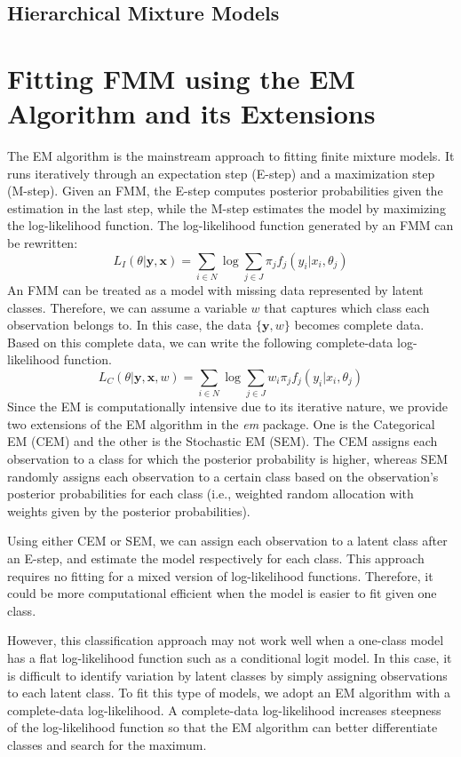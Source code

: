 \documentclass[nojss]{jss}
\begin{document}
      \subsection{Hierarchical Mixture Models}
   \section{Fitting FMM using the EM Algorithm and its Extensions}
   The EM algorithm is the mainstream approach to fitting finite mixture models. It runs iteratively through an expectation step (E-step) and a maximization step (M-step). Given an FMM, the E-step computes posterior probabilities given the estimation in the last step, while the M-step estimates the model by maximizing the log-likelihood function.
   The log-likelihood function generated by an FMM can be rewritten:
   \begin{equation}
   L_I(\theta|\mathbf{y},\mathbf{x}) = \sum_{i \in N} \log \sum_{j \in J} \pi_j f_j(y_i | x_i, \theta_j)
   \end{equation}
   An FMM can be treated as a model with missing data represented by latent classes. Therefore, we can assume a variable $w$ that captures which class each observation belongs to. In this case, the data $\{\mathbf{y}, w\}$ becomes complete data. Based on this complete data, we can write the following complete-data log-likelihood function.
   \begin{equation}
      L_C(\theta|\mathbf{y},\mathbf{x}, w) = \sum_{i \in N} \log \sum_{j \in J} w_i \pi_j f_j(y_i| x_i, \theta_j)
   \end{equation}
   Since the EM is computationally intensive due to its iterative nature, we provide two extensions of the EM algorithm in the \emph{em} package. One is the Categorical EM (CEM) and the other is the Stochastic EM (SEM). The CEM assigns each observation to a class for which the posterior probability is higher, whereas SEM randomly assigns each observation to a certain class based on the observation's posterior probabilities for each class (i.e., weighted random allocation with weights given by the posterior probabilities). 
   
   Using either CEM or SEM, we can assign each observation to a latent class after an E-step, and estimate the model respectively for each class. This approach requires no fitting for a mixed version of log-likelihood functions. Therefore, it could be more computational efficient when the model is easier to fit given one class.
   
   However, this classification approach may not work well when a one-class model has a flat log-likelihood function such as a conditional logit model. In this case, it is difficult to identify variation by latent classes by simply assigning observations to each latent class. To fit this type of models, we adopt an EM algorithm with a complete-data log-likelihood. A complete-data log-likelihood increases steepness of the log-likelihood function so that the EM algorithm can better differentiate classes and search for the maximum. 
   
\end{document}
